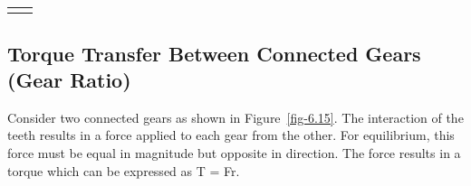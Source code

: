 \documentclass[
  letterpaper,
  DIV=11,
  numbers=noendperiod]{scrreprt}
\theoremstyle{definition}
\theoremstyle{remark}
\begin{document}
\begin{longtable}[]{@{}
  >{\raggedright\arraybackslash}p{}
  >{\raggedright\arraybackslash}p{}@{}}
                                                                                                                                                                                                                                                                                                                                                                                                                                                                                                                                                                                                                                                                                                                                                                                                                                                                                                                                                                                                                                                                                                                                                                                                                                                                                                                                                                                                                                                                                                                                                                                                                                                                                                                                        \) \\
\end{longtable}

\subsection{Torque Transfer Between Connected Gears (Gear
Ratio)}\label{torque-transfer-between-connected-gears-gear-ratio}

Consider two connected gears as shown in Figure~\ref{fig-6.15}. The
interaction of the teeth results in a force applied to each gear from
the other. For equilibrium, this force must be equal in magnitude but
opposite in direction. The force results in a torque which can be
expressed as T = Fr.
\end{document}
